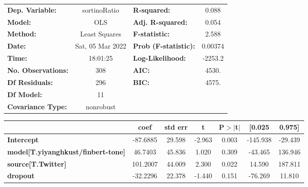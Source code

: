 \begin{center}
\begin{tabular}{lclc}
\toprule
\textbf{Dep. Variable:}                    &   sortinoRatio   & \textbf{  R-squared:         } &     0.088   \\
\textbf{Model:}                            &       OLS        & \textbf{  Adj. R-squared:    } &     0.054   \\
\textbf{Method:}                           &  Least Squares   & \textbf{  F-statistic:       } &     2.588   \\
\textbf{Date:}                             & Sat, 05 Mar 2022 & \textbf{  Prob (F-statistic):} &  0.00374    \\
\textbf{Time:}                             &     18:01:25     & \textbf{  Log-Likelihood:    } &   -2253.2   \\
\textbf{No. Observations:}                 &         308      & \textbf{  AIC:               } &     4530.   \\
\textbf{Df Residuals:}                     &         296      & \textbf{  BIC:               } &     4575.   \\
\textbf{Df Model:}                         &          11      & \textbf{                     } &             \\
\textbf{Covariance Type:}                  &    nonrobust     & \textbf{                     } &             \\
\bottomrule
\end{tabular}
\begin{tabular}{lcccccc}
                                           & \textbf{coef} & \textbf{std err} & \textbf{t} & \textbf{P$> |$t$|$} & \textbf{[0.025} & \textbf{0.975]}  \\
\midrule
\textbf{Intercept}                         &     -87.6885  &       29.598     &    -2.963  &         0.003        &     -145.938    &      -29.439     \\
\textbf{model[T.yiyanghkust/finbert-tone]} &      46.7403  &       45.836     &     1.020  &         0.309        &      -43.465    &      136.946     \\
\textbf{source[T.Twitter]}                 &     101.2007  &       44.009     &     2.300  &         0.022        &       14.590    &      187.811     \\
\textbf{dropout}                           &     -32.2296  &       22.378     &    -1.440  &         0.151        &      -76.269    &       11.810     \\

\end{tabular}
\end{center}
